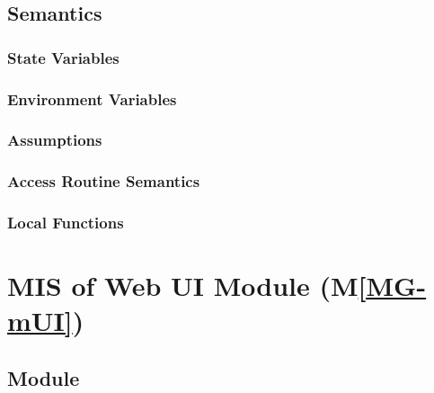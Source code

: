 \documentclass[12pt, titlepage]{article}
\newcommand{\mref}[1]{M\ref{MG-#1}}
\begin{document}
\subsection{Semantics}

\subsubsection{State Variables}


\subsubsection{Environment Variables}


\subsubsection{Assumptions}


\subsubsection{Access Routine Semantics}


\subsubsection{Local Functions}


\newpage

\section{MIS of Web UI Module (\mref{mUI})} \label{mis-mUI}

\subsection{Module}
\end{document}
